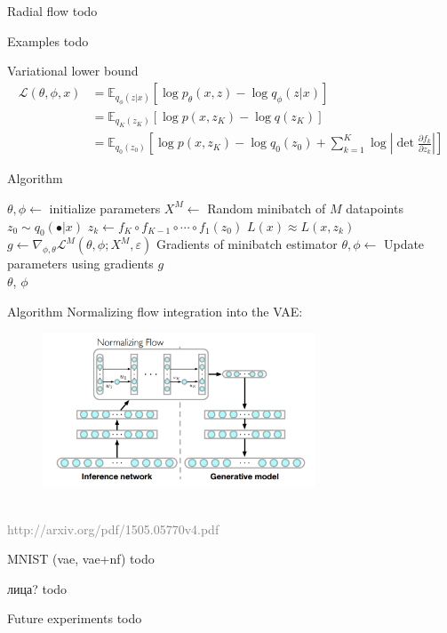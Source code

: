 \documentclass[unicode,11pt]{beamer}
\begin{document}
\begin{frame}[fragile]{Radial flow}
  todo
\end{frame}

\begin{frame}[fragile]{Examples}
  todo
\end{frame}

\begin{frame}[fragile]{Variational lower bound}
  \begin{align*} 
  \mathcal{L}(\theta, \phi, x) &= \mathbb{E}_{q_\phi(z|x)} \left[ \log p_\theta(x, z) - \log q_\phi(z | x) \right] \\
  &= \mathbb{E}_{q_K(z_K)} \left[ \log p(x, z_K) - \log q(z_K) \right] \\
  &= \mathbb{E}_{q_0(z_0)} \left[ \log p(x, z_K) - \log q_0(z_0) + \sum_{k=1}^K \log \left\vert \det 
  \frac{\partial f_k}  {\partial z_k} \right\vert \right] 
  \end{align*} 
\end{frame}

\begin{frame}[fragile]{Algorithm}
  \begin{algorithmic}
    \State $\theta, \phi \gets$ initialize parameters
    \Repeat 
       \State $X^M \gets$ Random minibatch of $M$ datapoints 
       \State $z_0 \sim q_0(\bullet|x)$ 
       \State $z_k \gets f_K \circ f_{K-1} \circ \cdots \circ f_1(z_0)$ 
       \State $L(x) \approx L(x, z_k)$
       \State $g \gets \nabla_{\phi, \theta} \mathcal{L}^M(\theta, \phi; X^M, \varepsilon) $ Gradients of minibatch estimator
       \State $\theta, \phi \gets$ Update parameters using gradients $g$
    \\
    \Return $\theta$, $\phi$
  \end{algorithmic}
  
\end{frame}

\begin{frame}[fragile]{Algorithm}
  Normalizing flow integration into the VAE:\\
  \begin{figure}[htbp]
    \includegraphics[height=130pt, keepaspectratio = true]{images/norFlow}   
  \end{figure}
  ~\\
  \tiny \textcolor{gray}{http://arxiv.org/pdf/1505.05770v4.pdf}
\end{frame}

\begin{frame}[fragile]{MNIST (vae, vae+nf)}
  todo
\end{frame}

\begin{frame}[fragile]{лица?}
  todo
\end{frame}

\begin{frame}[fragile]{Future experiments}
  todo 
\end{frame}
\end{document}
